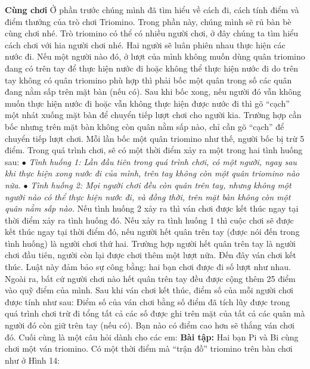 	{\bf {Cùng chơi}}   
	\vskip 0.1cm
	Ở phần trước chúng mình đã tìm hiểu về cách đi, cách tính điểm và điểm thưởng của trò chơi Triomino. Trong phần  này, chúng mình sẽ rủ bàn bè cùng chơi nhé.
	\vskip 0.1cm
	Trò triomino có thể có nhiều người chơi, ở đây chúng ta tìm hiểu cách chơi với hia người chơi nhé. Hai người sẽ luân phiên nhau thực hiện các nước đi.
	\vskip 0.1cm
	Nếu một người nào đó, ở lượt của mình không muốn dùng quân triomino đang có trên tay để thực hiện nước đi hoặc không thể thực hiện nước đi do trên tay không có quân triomino phù hợp thì phải bốc một quân trong số các quân đang nằm sấp trên mặt bàn (nếu có). Sau khi bốc xong, nếu người đó vẫn không muốn thực hiện nước đi hoặc vẫn không thực hiện được nước đi thì gõ “cạch” một nhát xuống mặt bàn để chuyển tiếp lượt chơi cho người kia. Trường hợp cần bốc nhưng trên mặt bàn không còn quân nằm sấp nào, chỉ cần gõ “cạch” để chuyển tiếp lượt chơi. Mỗi lần bốc một quân triomino như thế, người bốc bị trừ 5 điểm.
	\vskip 0.1cm
	Trong quá trình chơi, sẽ có một thời điểm xảy ra một trong hai tình huống sau:
	\vskip 0.1cm
	$\bullet$ \textit{Tình huống 1: Lần đầu tiên trong quá trình chơi, có một người, ngay sau khi thực hiện xong nước đi của mình, trên tay không còn một quân triomino nào nữa.}
	\vskip 0.1cm
	$\bullet$ \textit{Tình huống 2: Mọi người chơi đều còn quân trên tay, nhưng không một người nào có thể thực hiện nước đi, và đồng thời, trên mặt bàn không còn một quân nằm sấp nào.}
	\vskip 0.1cm
	Nếu tình huống 2 xảy ra thì ván chơi được kết thúc ngay tại thời điểm xảy ra tình huống đó.
	\vskip 0.1cm
	Nếu xảy ra tình huống 1 thì cuộc chơi sẽ được kết thúc ngay tại thời điểm đó, nếu người hết quân trên tay (được nói đến trong tình huống) là người chơi thứ hai. Trường hợp người hết quân trên tay là người chơi đầu tiên, người còn lại được chơi thêm một lượt  nữa. Đến đây ván chơi kết thúc. Luật này đảm bảo sự công bằng: hai bạn chơi được đi số lượt như nhau. Ngoài ra, bất cứ người chơi nào hết quân trên tay đều được cộng thêm 25 điểm vào quỹ điểm của mình.
	\vskip 0.1cm
	Sau khi ván chơi kết thúc, điểm số của mỗi người chơi được tính như sau: Điểm số của ván chơi bằng số điểm đã tích lũy được trong quá trình chơi trừ đi tổng tất cả các số được ghi trên mặt của tất cả các quân mà người đó còn giữ trên tay (nếu có). Bạn nào có điểm cao hơn sẽ thắng ván chơi đó. 
	\vskip 0.1cm
	Cuối cùng là một câu hỏi dành cho các em:
	\vskip 0.3cm
	\textbf{Bài tập:} Hai bạn Pi và Bi cùng chơi một ván triomino. Có một thời điểm mà “trận đồ” triomino trên bàn chơi như ở Hình 14:
	\vskip 0.1cm
